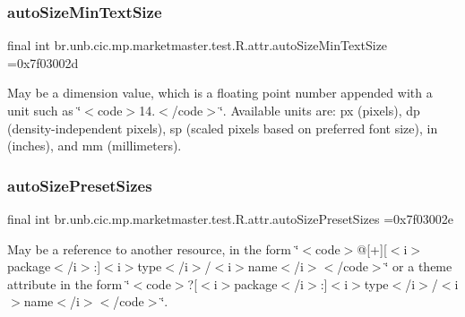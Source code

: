 \subsubsection{\texorpdfstring{auto\+Size\+Min\+Text\+Size}{autoSizeMinTextSize}}
{\footnotesize\ttfamily final int br.\+unb.\+cic.\+mp.\+marketmaster.\+test.\+R.\+attr.\+auto\+Size\+Min\+Text\+Size =0x7f03002d\hspace{0.3cm}{\ttfamily [static]}}

May be a dimension value, which is a floating point number appended with a unit such as \char`\"{}$<$code$>$14.\+5sp$<$/code$>$\char`\"{}. Available units are\+: px (pixels), dp (density-\/independent pixels), sp (scaled pixels based on preferred font size), in (inches), and mm (millimeters). \mbox{\label{classbr_1_1unb_1_1cic_1_1mp_1_1marketmaster_1_1test_1_1R_1_1attr_aa6f7587210e3769903431978394a1762}} 
\subsubsection{\texorpdfstring{auto\+Size\+Preset\+Sizes}{autoSizePresetSizes}}
{\footnotesize\ttfamily final int br.\+unb.\+cic.\+mp.\+marketmaster.\+test.\+R.\+attr.\+auto\+Size\+Preset\+Sizes =0x7f03002e\hspace{0.3cm}{\ttfamily [static]}}

May be a reference to another resource, in the form \char`\"{}$<$code$>$@\mbox{[}+\mbox{]}\mbox{[}$<$i$>$package$<$/i$>$\+:\mbox{]}$<$i$>$type$<$/i$>$/$<$i$>$name$<$/i$>$$<$/code$>$\char`\"{} or a theme attribute in the form \char`\"{}$<$code$>$?\mbox{[}$<$i$>$package$<$/i$>$\+:\mbox{]}$<$i$>$type$<$/i$>$/$<$i$>$name$<$/i$>$$<$/code$>$\char`\"{}. \mbox{\label{classbr_1_1unb_1_1cic_1_1mp_1_1marketmaster_1_1test_1_1R_1_1attr_a13133359d1e2f238e673011ebb913f20}} 
